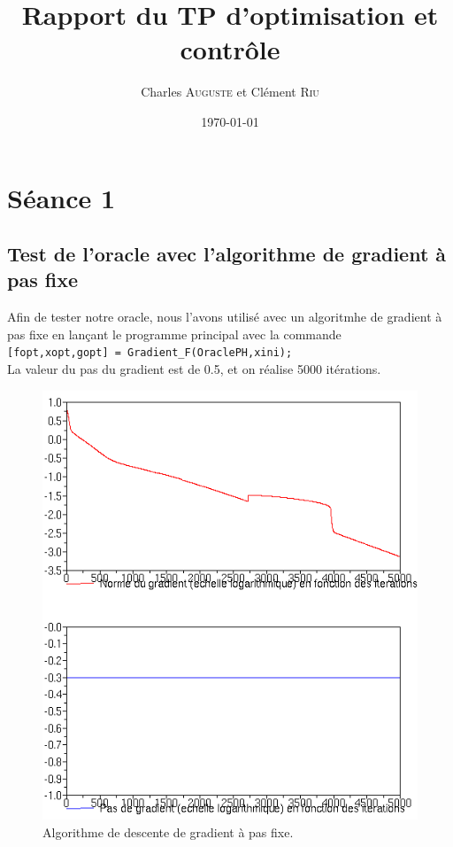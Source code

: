 \documentclass[11pt]{article}
\title{Rapport du TP d'optimisation et contrôle}
\author{Charles \textsc{Auguste} et Clément \textsc{Riu}}
\date{\today}
\begin{document}
\maketitle

\section*{Séance 1}

\subsection*{Test de l'oracle avec l'algorithme de gradient à pas fixe}
Afin de tester notre oracle, nous l'avons utilisé avec un algoritmhe de gradient à pas fixe en lançant le programme principal avec la commande\\
\texttt{[fopt,xopt,gopt] = Gradient\_F(OraclePH,xini);}\\
La valeur du pas du gradient est de 0.5, et on réalise 5000 itérations.

\begin{figure}[H]
  \centering
    \includegraphics[width=0.95 \textwidth]{Images/img1.png}
  \caption{Algorithme de descente de gradient à pas fixe.}
\end{figure}
\end{document}
